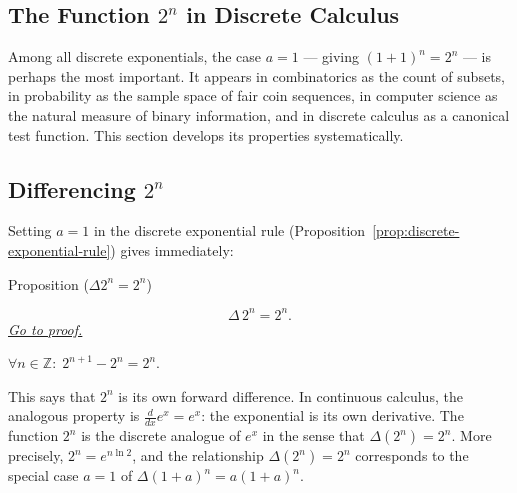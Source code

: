 
\subsection{\texorpdfstring{The Function \(2^n\) in Discrete Calculus}{The Function 2 to the n in Discrete Calculus}}
\label{subsec:two-to-the-n}

\begin{exposition}
Among all discrete exponentials, the case \(a = 1\) --- giving \((1+1)^n = 2^n\)
--- is perhaps the most important. It appears in combinatorics as the count
of subsets, in probability as the sample space of fair coin sequences, in
computer science as the natural measure of binary information, and in discrete
calculus as a canonical test function. This section develops its properties
systematically.
\end{exposition}

\subsection*{\texorpdfstring{Differencing \(2^n\)}{Differencing 2 to the n}}

\begin{exposition}
Setting \(a = 1\) in the discrete exponential rule
(Proposition~\ref{prop:discrete-exponential-rule}) gives immediately:
\end{exposition}

\begin{propositionbox}{Proposition (\(\Delta 2^n = 2^n\))}
\begin{proposition}[\(\Delta 2^n = 2^n\)]
\label{prop:delta-two-n}
\[
\Delta\, 2^n = 2^n.
\]
\hyperref[prf:delta-two-n]{\textit{Go to proof.}}
\end{proposition}
\end{propositionbox}

\begin{remark*}
\(\forall n \in \mathbb{Z}:\; 2^{n+1} - 2^n = 2^n\).
\end{remark*}

\begin{remark*}[Interpretation]
This says that \(2^n\) is its own forward difference. In continuous calculus,
the analogous property is \(\tfrac{d}{dx}e^x = e^x\): the exponential is its
own derivative. The function \(2^n\) is the discrete analogue of \(e^x\)
in the sense that \(\Delta(2^n) = 2^n\). More precisely, \(2^n = e^{n \ln 2}\),
and the relationship \(\Delta(2^n) = 2^n\) corresponds to the special case
\(a = 1\) of \(\Delta(1+a)^n = a(1+a)^n\).
\end{remark*}

